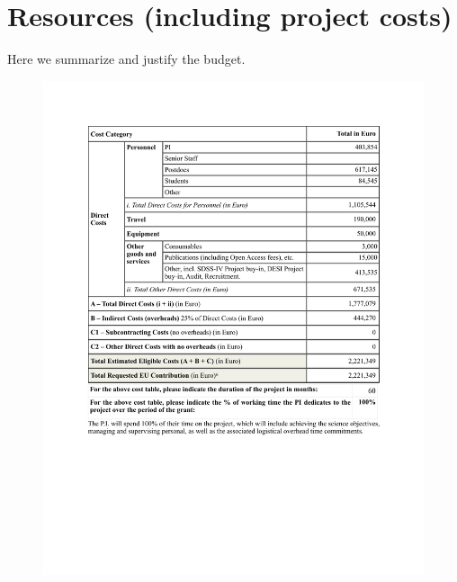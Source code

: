 \section{Resources (including project costs)}
Here we summarize and justify the budget.

\begin{figure}
  \begin{center}
    \hspace{-0.5cm}
    \includegraphics[width=16.6cm]
    {figures/ResourcesSummary.pdf}
    \vspace{-26pt}
 \label{fig:ResourcesSummary}
\end{center}
\end{figure}


